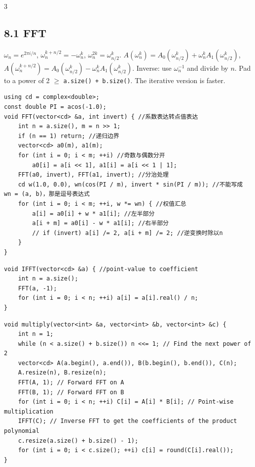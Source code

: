 \documentclass[8pt]{extarticle}
\begin{document}
\begin{multicols*}{3}
\subsection*{8.1 FFT}

$\omega_n = e^{2\pi i/n}$, $\omega_n^{k + n/2} = -\omega_n^k$, $\omega_n^{2k} = \omega_{n/2}^k$. $A(\omega_n^k) = A_0(\omega_{n/2}^k) + \omega_n^k A_1(\omega_{n/2}^k)$, $A(\omega_n^{k+n/2}) = A_0(\omega_{n/2}^k) - \omega_n^k A_1(\omega_{n/2}^k)$. Inverse: use $\omega_n^{-1}$ and divide by $n$. Pad to a power of 2 $\ge$ \texttt{a.size() + b.size()}. The iterative version is faster.


\begin{lstlisting}
using cd = complex<double>;
const double PI = acos(-1.0);
void FFT(vector<cd> &a, int invert) { //系数表达转点值表达
    int n = a.size(), m = n >> 1;
    if (n == 1) return; //递归边界
    vector<cd> a0(m), a1(m);
    for (int i = 0; i < m; ++i) //奇数与偶数分开
        a0[i] = a[i << 1], a1[i] = a[i << 1 | 1];
    FFT(a0, invert), FFT(a1, invert); //分治处理
    cd w(1.0, 0.0), wn(cos(PI / m), invert * sin(PI / m)); //不能写成 wn = (a, b)，那是逗号表达式
    for (int i = 0; i < m; ++i, w *= wn) { //权值汇总
        a[i] = a0[i] + w * a1[i]; //左半部分
        a[i + m] = a0[i] - w * a1[i]; //右半部分
        // if (invert) a[i] /= 2, a[i + m] /= 2; //逆变换时除以n
    }
}
\end{lstlisting}

\begin{lstlisting}
void IFFT(vector<cd> &a) { //point-value to coefficient
    int n = a.size();
    FFT(a, -1);
    for (int i = 0; i < n; ++i) a[i] = a[i].real() / n;
}
\end{lstlisting}

\begin{lstlisting}
void multiply(vector<int> &a, vector<int> &b, vector<int> &c) {
    int n = 1;
    while (n < a.size() + b.size()) n <<= 1; // Find the next power of 2
    vector<cd> A(a.begin(), a.end()), B(b.begin(), b.end()), C(n);
    A.resize(n), B.resize(n);
    FFT(A, 1); // Forward FFT on A
    FFT(B, 1); // Forward FFT on B
    for (int i = 0; i < n; ++i) C[i] = A[i] * B[i]; // Point-wise multiplication
    IFFT(C); // Inverse FFT to get the coefficients of the product polynomial
    c.resize(a.size() + b.size() - 1);
    for (int i = 0; i < c.size(); ++i) c[i] = round(C[i].real());
}
\end{lstlisting}


\end{multicols*}
\end{document}
